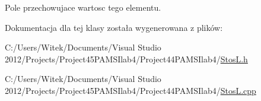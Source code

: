 Pole przechowujace wartosc tego elementu. 



Dokumentacja dla tej klasy została wygenerowana z plików\-:\begin{DoxyCompactItemize}
\item 
C\-:/\-Users/\-Witek/\-Documents/\-Visual Studio 2012/\-Projects/\-Project45\-P\-A\-M\-S\-Ilab4/\-Project44\-P\-A\-M\-S\-Ilab4/\hyperlink{_stos_l_8h}{Stos\-L.\-h}\item 
C\-:/\-Users/\-Witek/\-Documents/\-Visual Studio 2012/\-Projects/\-Project45\-P\-A\-M\-S\-Ilab4/\-Project44\-P\-A\-M\-S\-Ilab4/\hyperlink{_stos_l_8cpp}{Stos\-L.\-cpp}\end{DoxyCompactItemize}
